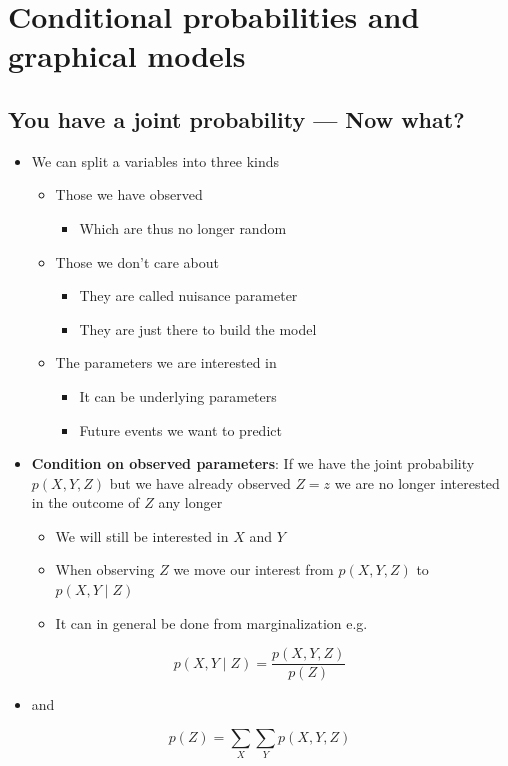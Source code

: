 \documentclass[11pt]{article}
\begin{document}
\section{Conditional probabilities and graphical models}
\label{sec:orgb468ddd}
\subsection{You have a joint probability — Now what?}
\label{sec:org9633611}
\begin{itemize}
\item We can split a variables into three kinds
\begin{itemize}
\item Those we have observed
\begin{itemize}
\item Which are thus no longer random
\end{itemize}
\item Those we don't care about
\begin{itemize}
\item They are called nuisance parameter
\item They are just there to build the model
\end{itemize}
\item The parameters we are interested in
\begin{itemize}
\item It can be underlying parameters
\item Future events we want to predict
\end{itemize}
\end{itemize}

\item \textbf{Condition on observed parameters}: If we have the joint probability \(p(X,Y,Z)\) but we have already observed \(Z = z\) we are no longer interested in the outcome of \(Z\) any longer
\begin{itemize}
\item We will still be interested in \(X\) and \(Y\)
\item When observing \(Z\) we move our interest from \(p(X,Y,Z)\) to \(p(X,Y \mid Z)\)
\item It can in general be done from marginalization e.g.
\end{itemize}
\end{itemize}
\begin{equation}
  p(X,Y \mid Z) = \frac{p(X,Y,Z)}{p(Z)}
\end{equation}
\begin{itemize}
\item and
\end{itemize}
\begin{equation}
  p(Z) = \sum_X \sum_Y p(X,Y,Z) 
\end{equation}
\end{document}
